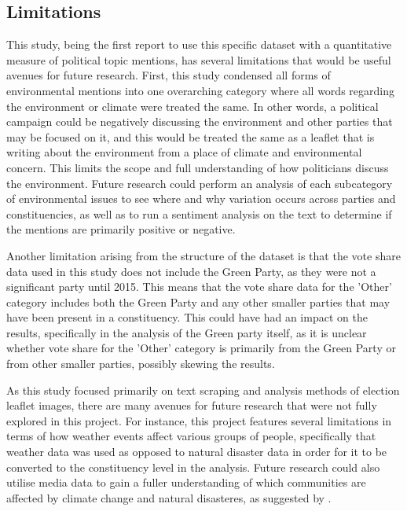 \documentclass[preprint,12pt,authoryear]{elsarticle}
\begin{document}
\subsection{Limitations}



This study, being the first report to use this specific dataset with a quantitative measure of political topic mentions, has several limitations that would be useful avenues for future research. First, this study condensed all forms of environmental mentions into one overarching category where all words regarding the environment or climate were treated the same. In other words, a political campaign could be negatively discussing the environment and other parties that may be focused on it, and this would be treated the same as a leaflet that is writing about the environment from a place of climate and environmental concern. This limits the scope and full understanding of how politicians discuss the environment. Future research could perform an analysis of each subcategory of environmental issues to see where and why variation occurs across parties and constituencies, as well as to run a sentiment analysis on the text to determine if the mentions are primarily positive or negative.

Another limitation arising from the structure of the dataset is that the vote share data used in this study does not include the Green Party, as they were not a significant party until 2015. This means that the vote share data for the 'Other' category includes both the Green Party and any other smaller parties that may have been present in a constituency. This could have had an impact on the results, specifically in the analysis of the Green party itself, as it is unclear whether vote share for the 'Other' category is primarily from the Green Party or from other smaller parties, possibly skewing the results.

As this study focused primarily on text scraping and analysis methods of election leaflet images, there are many avenues for future research that were not fully explored in this project. For instance, this project features several limitations in terms of how weather events affect various groups of people, specifically that weather data was used as opposed to natural disaster data in order for it to be converted to the constituency level in the analysis. Future research could also utilise media data to gain a fuller understanding of which communities are affected by climate change and natural disasteres, as suggested by \citet{siscoEffectsWeatherExperiences2021}. 
\end{document}

